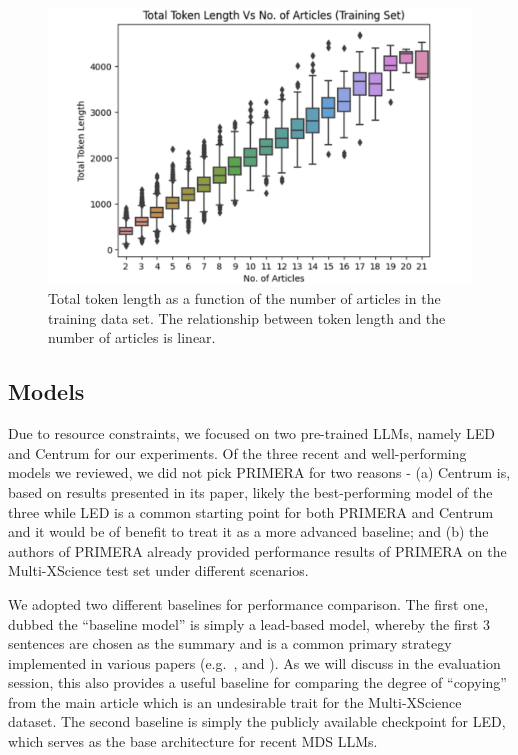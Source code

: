 \documentclass[12pt, twocolumn]{article}
\numberwithin{equation}{section}
\begin{document}
\begin{figure}
    \captionsetup{width=\columnwidth}
    \includegraphics[width=\columnwidth]{token_length.png}
    \caption{Total token length as a function of the number of articles in the training data set. The relationship between token length and the number of articles is linear.}
    \label{fig:token-length}
\end{figure}

\subsection{Models}
\label{ssec:models}

Due to resource constraints, we focused on two pre-trained LLMs, namely LED and Centrum for our experiments.  Of the three recent and well-performing models we reviewed, we did not pick PRIMERA for two reasons - (a) Centrum is, based on results presented in its paper, likely the best-performing model of the three while LED is a common starting point for both PRIMERA and Centrum and it would be of benefit to treat it as a more advanced baseline; and (b) the authors of PRIMERA already provided performance results of PRIMERA on the Multi-XScience test set under different scenarios. 

We adopted two different baselines for performance comparison.  The first one, dubbed the ``baseline model'' is simply a lead-based model, whereby the first 3 sentences are chosen as the summary and is a common primary strategy implemented in various papers (e.g.~\cite{lu-etal-2020-multi-xscience}, \cite{see2017point} and \cite{zhang2020pegasus}).  As we will discuss in the evaluation session, this also provides a useful baseline for comparing the degree of ``copying'' from the main article which is an undesirable trait for the Multi-XScience dataset.  The second baseline is simply the publicly available checkpoint for LED, which serves as the base architecture for recent MDS LLMs.  
\end{document}
